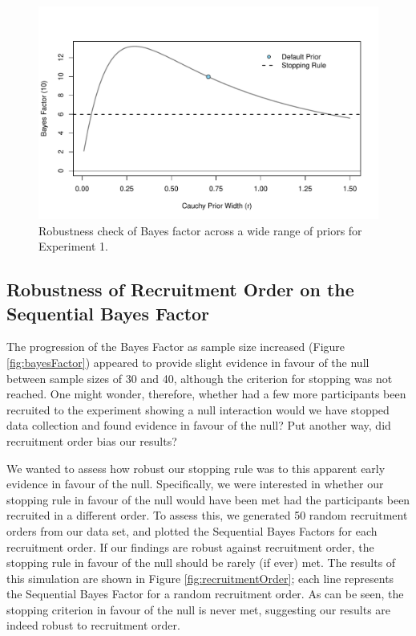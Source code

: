 \documentclass[a4paper, doc, natbib]{apa6}
\begin{document}
\begin{figure}
\begin{center}
\includegraphics[width = \textwidth]{Images/robustPrior.pdf}
\caption{Robustness check of Bayes factor across a wide range of priors for Experiment 1.}
\label{fig:robustPrior}
\end{center}
\end{figure}


\subsection{Robustness of Recruitment Order on the Sequential Bayes Factor}
The progression of the Bayes Factor as sample size increased (Figure \ref{fig:bayesFactor}) appeared to provide slight evidence in favour of the null between sample sizes of 30 and 40, although the criterion for stopping was not reached. One might wonder, therefore, whether had a few more participants been recruited to the experiment showing a null interaction would we have stopped data collection and found evidence in favour of the null? Put another way, did recruitment order bias our results?

We wanted to assess how robust our stopping rule was to this apparent early evidence in favour of the null. Specifically, we were interested in whether our stopping rule in favour of the null would have been met had the participants been recruited in a different order. To assess this, we generated 50 random recruitment orders from our data set, and plotted the Sequential Bayes Factors for each recruitment order. If our findings are robust against recruitment order, the stopping rule in favour of the null should be rarely (if ever) met.  The results of this simulation are shown in Figure \ref{fig:recruitmentOrder}; each line represents the Sequential Bayes Factor for a random recruitment order. As can be seen, the stopping criterion in favour of the null is never met, suggesting our results are indeed robust to recruitment order. 
\end{document}
